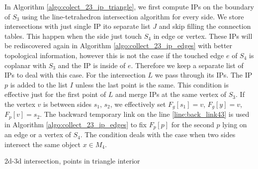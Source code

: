 \documentclass{elsarticle}
\def\abs#1{\left|#1\right|}
\def\abs#1{| #1 |}
\begin{document}
In Algorithm \ref{algo:colect_23_ip_triangle}, we first compute IPs
on the boundary of $S_3$ using the line-tetrahedron intersection algorithm for every side. We store intersections with just single IP ito separate list $J$
and skip filling the connection tables. This happen when the side just touch $S_4$ in edge or vertex. 
These IPs will be rediscovered again in Algorithm \ref{algo:collect_23_ip_edges} with better topological information, however
this is not the case if the touched edge $e$ of $S_4$ is coplanar with $S_3$ and the IP is inside of $e$. 
Therefore we keep a separate list of IPs to deal with this case.
For the intersection $L$ we pass through its IPs. The IP $p$ is added to the list $I$ unless the last point is the same. 
This condition is effective just for the first point of $L$ and merge IPs at the same vertex of $S_3$. If the vertex $v$ is between sides $s_1$, $s_2$, 
we effectively set $F_g[s_1] = v$, $F_g[y]=v$, $F_p[v] = s_2$. The backward temporary link on the line \ref{line:back_link43} 
is used in Algorithm \ref{algo:collect_23_ip_edges} to fix $F_p[p]$ for the second $p$ lying on an edge or a vertex of $S_4$. The condition deals with the case
when two sides intersect the same object $x\in M_4$.


\begin{algorithm}  
  \caption{2d-3d intersection, points in triangle interior}
  \label{algo:collect_23_ip_edges}
  
  \DontPrintSemicolon
  
  
  \lIf{$\abs{I} < 3$}{ \return $J$}
\end{algorithm}
\end{document}
